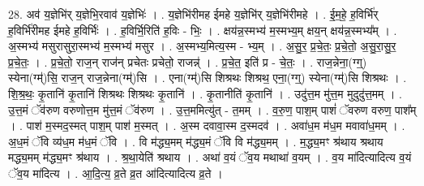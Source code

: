 \documentclass[17pt]{extarticle}
\begin{document}
28. अव॑ य॒ज्ञेभि॑र् य॒ज्ञेभि॒रवाव॑ य॒ज्ञेभिः॑ । . य॒ज्ञेभि॑रीमह ईमहे य॒ज्ञेभि॑र् य॒ज्ञेभि॑रीमहे । . ई॒म॒हे॒ ह॒विर्भि॑र् ह॒विर्भि॑रीमह ईमहे ह॒विर्भिः॑ । . ह॒विर्भि॒रिति॑ ह॒विः - भिः॒ । . क्षय॑न्न॒स्मभ्य॑ म॒स्मभ्य॒म् क्षय॒न् क्षय॑न्न॒स्मभ्य᳚म् । . अ॒स्मभ्य॑ मसुरासुरा॒स्मभ्य॑ म॒स्मभ्य॑ मसुर । . अ॒स्मभ्य॒मित्य॒स्म - भ्य॒म् । . अ॒सु॒र॒ प्र॒चे॒तः॒ प्र॒चे॒तो॒ अ॒सु॒रा॒सु॒र॒ प्र॒चे॒तः॒ । . प्र॒चे॒तो॒ राज॒न् राज॑न् प्रचेतः प्रचेतो॒ राजन्न्॑ । . प्र॒चे॒त॒ इति॑ प्र - चे॒तः॒ । . राज॒न्नेना॒(ग्ग्॒) स्येना(ग्म्॑)सि॒ राज॒न् राज॒न्नेना(ग्म्॑)सि । . एना(ग्म्॑)सि शिश्रथः शिश्रथ॒ एना॒(ग्ग्॒) स्येना(ग्म्॑)सि शिश्रथः । . शि॒श्र॒थः॒ कृ॒तानि॑ कृ॒तानि॑ शिश्रथः शिश्रथः कृ॒तानि॑ । . कृ॒तानीति॑ कृ॒तानि॑ । . उदु॑त्त॒म मु॑त्त॒म मुदुदु॑त्त॒मम् । . उ॒त्त॒मं ॅव॑रुण वरुणोत्त॒म मु॑त्त॒मं ॅव॑रुण । . उ॒त्त॒ममित्यु॑त् - त॒मम् । . व॒रु॒ण॒ पाश॒म् पाशं॑ ॅवरुण वरुण॒ पाश᳚म् । . पाश॑ म॒स्मद॒स्मत् पाश॒म् पाश॑ म॒स्मत् । . अ॒स्म दवावा॒स्म द॒स्मदव॑ । . अवा॑ध॒म म॑ध॒म मवावा॑ध॒मम् । . अ॒ध॒मं ॅवि व्य॑ध॒म म॑ध॒मं ॅवि । . वि म॑द्ध्य॒मम् म॑द्ध्य॒मं ॅवि वि म॑द्ध्य॒मम् । . म॒द्ध्य॒मꣳ श्र॑थाय श्रथाय मद्ध्य॒मम् म॑द्ध्य॒मꣳ श्र॑थाय । . श्र॒था॒येति॑ श्रथाय । . अथा॑ व॒यं ॅव॒य मथाथा॑ व॒यम् । . व॒य मा॑दित्यादित्य व॒यं ॅव॒य मा॑दित्य । . आ॒दि॒त्य॒ व्र॒ते व्र॒त आ॑दित्यादित्य व्र॒ते । \newline
\end{document}
